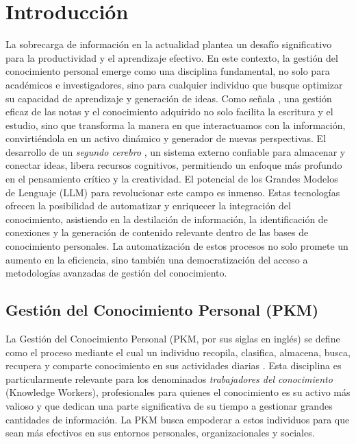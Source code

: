 \chapter{Introducción}
\label{chapter:introduccion}

La sobrecarga de información en la actualidad plantea un desafío significativo para la productividad y el aprendizaje efectivo. En este contexto, la gestión del conocimiento personal emerge como una disciplina fundamental, no solo para académicos e investigadores, sino para cualquier individuo que busque optimizar su capacidad de aprendizaje y generación de ideas. Como señala \cite{ahrensHowTakeSmart2017}, una gestión eficaz de las notas y el conocimiento adquirido no solo facilita la escritura y el estudio, sino que transforma la manera en que interactuamos con la información, convirtiéndola en un activo dinámico y generador de nuevas perspectivas. El desarrollo de un \textit{segundo cerebro} \parencite{forteBuildingSecondBrain2022}, un sistema externo confiable para almacenar y conectar ideas, libera recursos cognitivos, permitiendo un enfoque más profundo en el pensamiento crítico y la creatividad.
El potencial de los Grandes Modelos de Lenguaje (LLM) para revolucionar este campo es inmenso. Estas tecnologías ofrecen la posibilidad de automatizar y enriquecer la integración del conocimiento, asistiendo en la destilación de información, la identificación de conexiones y la generación de contenido relevante dentro de las bases de conocimiento personales. La automatización de estos procesos no solo promete un aumento en la eficiencia, sino también una democratización del acceso a metodologías avanzadas de gestión del conocimiento.

\section{Gestión del Conocimiento Personal (PKM)}
\label{sec:pkm}
La Gestión del Conocimiento Personal (PKM, por sus siglas en inglés) se define como el proceso mediante el cual un individuo recopila, clasifica, almacena, busca, recupera y comparte conocimiento en sus actividades diarias \parencite{grundspenkisAgentBasedApproach2007}. Esta disciplina es particularmente relevante para los denominados \textit{trabajadores del conocimiento} (Knowledge Workers), profesionales para quienes el conocimiento es su activo más valioso y que dedican una parte significativa de su tiempo a gestionar grandes cantidades de información. La PKM busca empoderar a estos individuos para que sean más efectivos en sus entornos personales, organizacionales y sociales.

